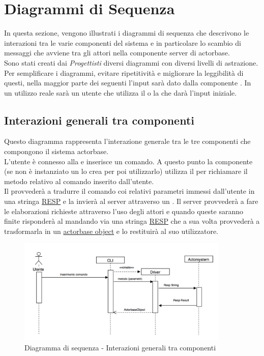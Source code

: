 \documentclass{scalatekids-article}
\begin{document}
\section{Diagrammi di Sequenza}

In questa sezione, vengono illustrati i diagrammi di sequenza che descrivono
le interazioni tra le varie componenti del sistema e in particolare lo scambio
di messaggi che avviene tra gli attori nella componente server di actorbase.\\
Sono stati creati dai \textit{Progettisti} diversi diagrammi con diversi livelli
di astrazione.\\
Per semplificare i diagrammi, evitare ripetitività e migliorare la leggibilità di
questi, nella maggior parte dei seguenti l'input sarà dato dalla componente . In un utilizzo reale sarà un utente che utilizza il  o la
 che darà l'input iniziale.

\subsection{Interazioni generali tra componenti}
Questo diagramma rappresenta l'interazione generale tra le tre componenti che
compongono il sistema actorbase.\\
L'utente è connesso alla  e inserisce un comando. A questo punto la
componente  (se non è instanziato un  lo crea per poi
utilizzarlo) utilizza il  per richiamare il metodo relativo al
comando inserito dall'utente.\\Il {} provvederà a tradurre il
comando coi relativi parametri immessi dall'utente in una stringa
\hyperref[sec:RESP]{RESP} e la invierà al server attraverso un . Il server provvederà a fare le elaborazioni richieste attraverso l'uso
degli attori e quando queste saranno finite risponderà al 
mandando via  una stringa \hyperref[sec:RESP]{RESP} che a sua
volta provvederà a trasformarla in un
\hyperref[sec:driver::actorbasedata::actorbaseobject]{actorbase object} e lo
restituirà al suo utilizzatore.
\begin{figure}[H]
  \begin{center}
    \includegraphics[width=0.9\textwidth, keepaspectratio]{img/diagrammiSequenza/ScambioMessaggiGenerico.png}
    \caption{Diagramma di sequenza - Interazioni generali tra componenti}
  \end{center}
\end{figure}
\end{document}
